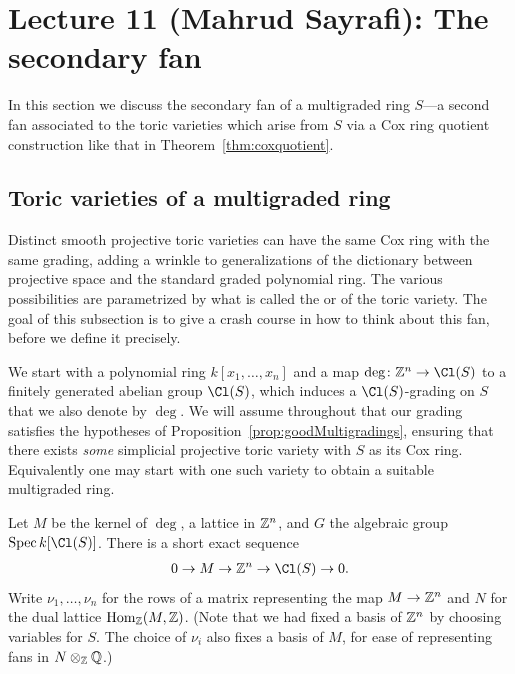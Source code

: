 \documentclass{article}
\begin{document}
\fi

\section{Lecture 11 (Mahrud Sayrafi): The secondary fan}\label{lec:11-secondary-fan}
In this section we discuss the secondary fan of a multigraded ring $S$---a second fan associated to the toric varieties which arise from $S$ via a Cox ring quotient construction like that in Theorem~\ref{thm:coxquotient}.

\subsection{Toric varieties of a multigraded ring}
Distinct smooth projective toric varieties can have the same Cox ring with the same grading, adding a wrinkle to generalizations of the dictionary between projective space and the standard graded polynomial ring.  The various possibilities are parametrized by what is called the  or  of the toric variety.  The goal of this subsection is to give a crash course in how to think about this fan, before we define it precisely.

\begin{notation}\label{not:multigrading}
  We start with a polynomial ring $k[x_1,\ldots,x_n]$
  and a map $\deg\colon\ZZ^n\to\Cl(S)$ to a finitely generated abelian group $\Cl(S)$,
  which induces a $\Cl(S)$-grading on $S$ that we also denote by $\deg$.  We will assume throughout that our grading satisfies the hypotheses of Proposition~\ref{prop:goodMultigradings}, ensuring that there exists \emph{some} simplicial projective toric variety with $S$ as its Cox ring.  Equivalently one may start with one such variety to obtain a suitable multigraded ring.

  Let $M$ be the kernel of $\deg$, a lattice in $\mathbb Z^n$, and $G$ the algebraic group $\Spec k[\Cl(S)]$.  There is a short exact sequence
  \begin{align}\label{eq:M-SES}
    0\to M\to\ZZ^n\to\Cl(S)\to 0.
  \end{align}
  Write $\nu_1,\ldots,\nu_n$ for the rows of a matrix representing the map $M\to\mathbb Z^n$ and $N$ for the dual lattice $\operatorname{Hom}_\mathbb Z(M,\mathbb Z)$.  (Note that we had fixed a basis of $\mathbb Z^n$ by choosing variables for $S$.  The choice of $\nu_i$ also fixes a basis of $M$, for ease of representing fans in $N\otimes_\mathbb Z\mathbb Q$.)
\end{notation}
\end{document}

